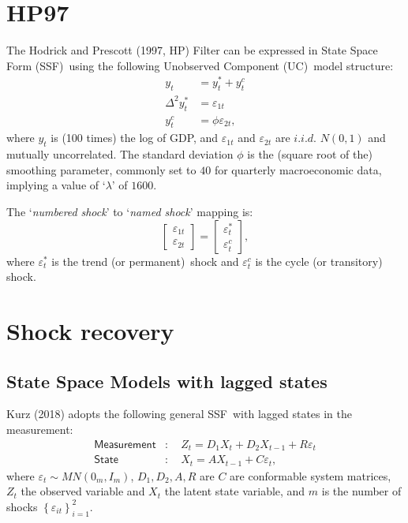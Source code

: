 \documentclass[a4paper,final,12pt]{article}
\newcommand{\bsq}{\begin{subequations}}\newcommand{\esq}{\end{subequations}}
\begin{document}
\section{HP97}

The Hodrick and Prescott (1997, HP) Filter can be expressed in State Space
Form (SSF)\ using the following Unobserved Component (UC)\ model structure:%
\bsq\label{HP0}%
\begin{align}
y_{t}& =y_{t}^{\ast }+y_{t}^{c}  \label{HP0a} \\
\Delta ^{2}y_{t}^{\ast }& =\varepsilon _{1t}  \label{HP0b} \\
y_{t}^{c}& =\phi \varepsilon _{2t},  \label{HP0c}
\end{align}%
\esq where $y_{t}$ is (100 times) the log of GDP, and $\varepsilon _{1t}$
and $\varepsilon _{2t}$ are $i.i.d.$ $N(0,1)$ and mutually uncorrelated. The
standard deviation $\phi $ is the (square root of the) smoothing parameter,
commonly set to $40$ for quarterly macroeconomic data, implying a value of `$%
\lambda $' of $1600$.

The `\emph{numbered} \emph{shock}' to `\emph{named shock}' mapping is:%
\begin{equation}
\begin{bmatrix}
\varepsilon _{1t} \\ 
\varepsilon _{2t}%
\end{bmatrix}%
=%
\begin{bmatrix}
\varepsilon _{t}^{\ast } \\ 
\varepsilon _{t}^{c}%
\end{bmatrix}%
,
\end{equation}%
where $\varepsilon _{t}^{\ast }$ is the trend (or permanent)\ shock and $%
\varepsilon _{t}^{c}$ is the cycle (or transitory) shock.

\section{Shock recovery}

\subsection{State Space Models with lagged states}

Kurz (2018) adopts the following general SSF\ with lagged states in the
measurement:\bsq\label{SSM}%
\begin{align}
\mathsf{Measurement}& :\quad Z_{t}=D_{1}X_{t}+D_{2}X_{t-1}+R\varepsilon _{t}
\label{ssm1} \\
\mathsf{State}& :\quad X_{t}=AX_{t-1}+C\varepsilon _{t},  \label{ssm2}
\end{align}%
\esq where $\varepsilon _{t}\sim MN(0_{m},I_{m})$, $D_{1},D_{2},A,R$ are $C$
are conformable system matrices, $Z_{t}$ the observed variable and $X_{t}$
the latent state variable, and $m$ is the number of shocks $\left\{
\varepsilon _{it}\right\} _{i=1}^{2}$.
\end{document}
